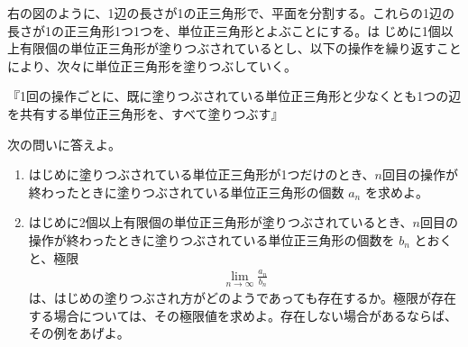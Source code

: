 右の図のように、1辺の長さが1の正三角形で、平面を分割する。これらの1辺の長さが1の正三角形1つ1つを、単位正三角形とよぶことにする。は
じめに1個以上有限個の単位正三角形が塗りつぶされているとし、以下の操作を繰り返すことにより、次々に単位正三角形を塗りつぶしていく。

『1回の操作ごとに、既に塗りつぶされている単位正三角形と少なくとも1つの辺を共有する単位正三角形を、すべて塗りつぶす』

次の問いに答えよ。

\begin{enumerate}
  \item はじめに塗りつぶされている単位正三角形が1つだけのとき、$n$回目の操作が終わったときに塗りつぶされている単位正三角形の個数 $a_n$ を求めよ。
  \item はじめに2個以上有限個の単位正三角形が塗りつぶされているとき、$n$回目の操作が終わったときに塗りつぶされている単位正三角形の個数を $b_n$ とおくと、極限
        \begin{align}
          \lim_{n \to \infty} \frac{a_n}{b_n}
        \end{align}
        は、はじめの塗りつぶされ方がどのようであっても存在するか。極限が存在する場合については、その極限値を求めよ。存在しない場合があるならば、その例をあげよ。
\end{enumerate}

\begin{figure}[H]
  \centering
\end{figure}
